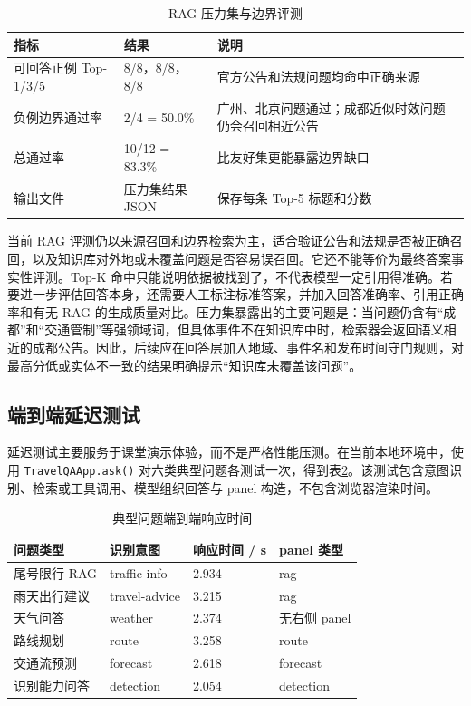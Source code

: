 \documentclass[bwprint]{report}
\begin{document}
\begin{table}[H]
    \caption{RAG 压力集与边界评测}
    \label{tab:rag-stress}
    \centering
    \small
    \begin{tabular}{p{}p{}p{}}
        \toprule[1.5pt]
        指标 & 结果 & 说明 \\
        \midrule[1pt]
        可回答正例 Top-1/3/5 & 8/8，8/8，8/8 & 官方公告和法规问题均命中正确来源 \\
        负例边界通过率 & 2/4 = 50.0\% & 广州、北京问题通过；成都近似时效问题仍会召回相近公告 \\
        总通过率 & 10/12 = 83.3\% & 比友好集更能暴露边界缺口 \\
        输出文件 & 压力集结果 JSON & 保存每条 Top-5 标题和分数 \\
        \bottomrule[1.5pt]
    \end{tabular}
\end{table}

当前 RAG 评测仍以来源召回和边界检索为主，适合验证公告和法规是否被正确召回，以及知识库对外地或未覆盖问题是否容易误召回。它还不能等价为最终答案事实性评测。Top-K 命中只能说明依据被找到了，不代表模型一定引用得准确。若要进一步评估回答本身，还需要人工标注标准答案，并加入回答准确率、引用正确率和有无 RAG 的生成质量对比。压力集暴露出的主要问题是：当问题仍含有``成都''和``交通管制''等强领域词，但具体事件不在知识库中时，检索器会返回语义相近的成都公告。因此，后续应在回答层加入地域、事件名和发布时间守门规则，对最高分低或实体不一致的结果明确提示``知识库未覆盖该问题''。

\subsection{端到端延迟测试}
延迟测试主要服务于课堂演示体验，而不是严格性能压测。在当前本地环境中，使用 \texttt{TravelQAApp.ask()} 对六类典型问题各测试一次，得到表\ref{tab:latency}。该测试包含意图识别、检索或工具调用、模型组织回答与 panel 构造，不包含浏览器渲染时间。

\begin{table}[H]
    \caption{典型问题端到端响应时间}
    \label{tab:latency}
    \centering
    \small
    \begin{tabular}{p{}p{}p{}p{}}
        \toprule[1.5pt]
        问题类型 & 识别意图 & 响应时间 / s & panel 类型 \\
        \midrule[1pt]
        尾号限行 RAG & traffic-info & 2.934 & rag \\
        雨天出行建议 & travel-advice & 3.215 & rag \\
        天气问答 & weather & 2.374 & 无右侧 panel \\
        路线规划 & route & 3.258 & route \\
        交通流预测 & forecast & 2.618 & forecast \\
        识别能力问答 & detection & 2.054 & detection \\
        \bottomrule[1.5pt]
    \end{tabular}
\end{table}
\end{document}
